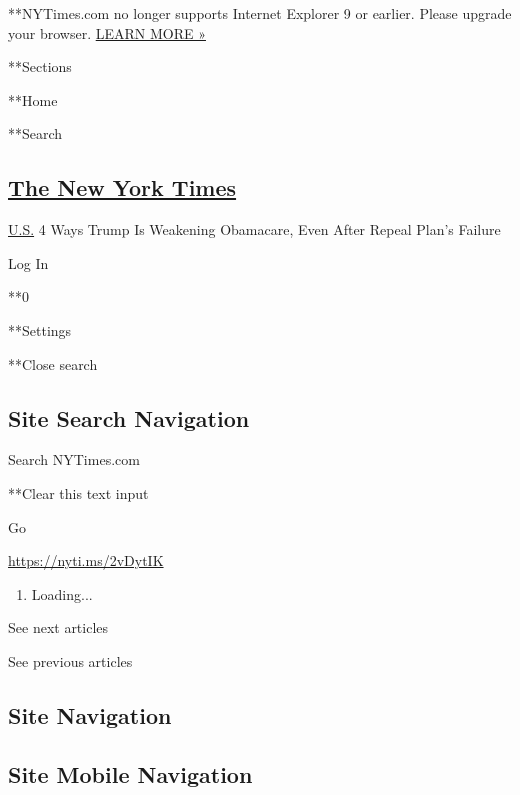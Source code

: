  **NYTimes.com no longer supports Internet Explorer 9 or earlier. Please
upgrade your browser.
\href{http://www.nytimes.com/content/help/site/ie9-support.html}{LEARN
MORE »}

**Sections

**Home

**Search

\hypertarget{the-new-york-times}{%
\subsection{\texorpdfstring{\href{http://www.nytimes.com/}{The New York
Times}}{The New York Times}}\label{the-new-york-times}}

 \href{https://www.nytimes.com/section/us}{U.S.} \textbar{}4 Ways Trump
Is Weakening Obamacare, Even After Repeal Plan's Failure

Log In

**0

**Settings

**Close search

\hypertarget{site-search-navigation}{%
\subsection{Site Search Navigation}\label{site-search-navigation}}

Search NYTimes.com

**Clear this text input

Go

\url{https://nyti.ms/2vDytIK}

\begin{enumerate}
\def\labelenumi{\arabic{enumi}.}
\item
  Loading...
\end{enumerate}

See next articles

See previous articles

\hypertarget{site-navigation}{%
\subsection{Site Navigation}\label{site-navigation}}

\hypertarget{site-mobile-navigation}{%
\subsection{Site Mobile Navigation}\label{site-mobile-navigation}}

